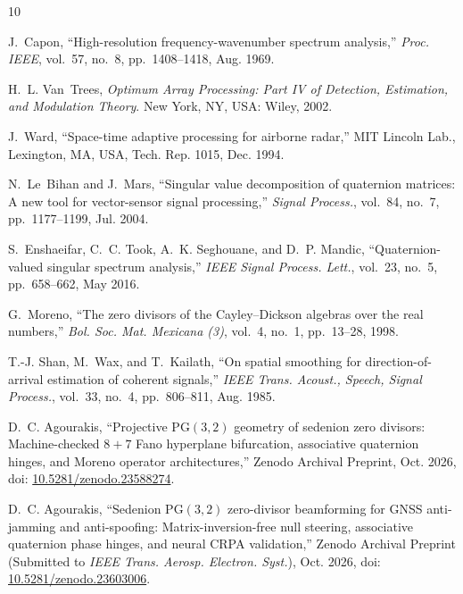\documentclass[journal,twoside]{IEEEtran}
\theoremstyle{definition}
\theoremstyle{remark}
\newcommand{\PG}{\mathrm{PG}}
\begin{document}
\begin{thebibliography}{10}

J.~Capon, ``High-resolution frequency-wavenumber spectrum analysis,'' \emph{Proc. IEEE}, vol.~57, no.~8, pp.~1408--1418, Aug. 1969.

H.~L. Van~Trees, \emph{Optimum Array Processing: Part IV of Detection, Estimation, and Modulation Theory}. New York, NY, USA: Wiley, 2002.

J.~Ward, ``Space-time adaptive processing for airborne radar,'' MIT Lincoln Lab., Lexington, MA, USA, Tech. Rep. 1015, Dec. 1994.

N.~Le~Bihan and J.~Mars, ``Singular value decomposition of quaternion matrices: A new tool for vector-sensor signal processing,'' \emph{Signal Process.}, vol.~84, no.~7, pp.~1177--1199, Jul. 2004.

S.~Enshaeifar, C.~C. Took, A.~K. Seghouane, and D.~P. Mandic, ``Quaternion-valued singular spectrum analysis,'' \emph{IEEE Signal Process. Lett.}, vol.~23, no.~5, pp.~658--662, May 2016.

G.~Moreno, ``The zero divisors of the Cayley--Dickson algebras over the real numbers,'' \emph{Bol. Soc. Mat. Mexicana (3)}, vol.~4, no.~1, pp.~13--28, 1998.

T.-J. Shan, M.~Wax, and T.~Kailath, ``On spatial smoothing for direction-of-arrival estimation of coherent signals,'' \emph{IEEE Trans. Acoust., Speech, Signal Process.}, vol.~33, no.~4, pp.~806--811, Aug. 1985.

D.~C. Agourakis, ``Projective $\PG(3,2)$ geometry of sedenion zero divisors: Machine-checked $8+7$ Fano hyperplane bifurcation, associative quaternion hinges, and Moreno operator architectures,'' Zenodo Archival Preprint, Oct. 2026, doi: \href{https://doi.org/10.5281/zenodo.23588274}{10.5281/zenodo.23588274}.

D.~C. Agourakis, ``Sedenion $\PG(3,2)$ zero-divisor beamforming for GNSS anti-jamming and anti-spoofing: Matrix-inversion-free null steering, associative quaternion phase hinges, and neural CRPA validation,'' Zenodo Archival Preprint (Submitted to \emph{IEEE Trans. Aerosp. Electron. Syst.}), Oct. 2026, doi: \href{https://doi.org/10.5281/zenodo.23603006}{10.5281/zenodo.23603006}.

\end{thebibliography}
\end{document}

